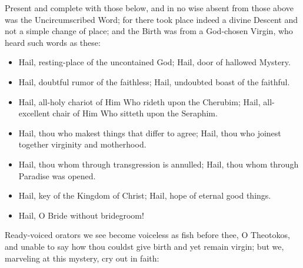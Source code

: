 \documentclass[twoside, letterpaper, 12pt]{report}
\begin{document}
\begin{reader}
  \item Present and complete with those below, and in no wise absent from those above was
  the Uncircumscribed Word; for there took place indeed a divine Descent and not a
  simple change of place; and the Birth was from a God-chosen Virgin, who heard such
  words as these:
\end{reader}

\begin{itemize}[label=\tiny{+},leftmargin=*]
\item Hail, resting-place of the uncontained God;
      Hail, door of hallowed Mystery.
\item Hail, doubtful rumor of the faithless; Hail, undoubted boast of the faithful.
\item Hail, all-holy chariot of Him Who rideth upon the Cherubim; Hail, all-excellent chair of Him
Who sitteth upon the Seraphim.
\item Hail, thou who makest things that differ to agree; Hail, thou who joinest together virginity and
motherhood.
\item Hail, thou whom through transgression is annulled; Hail, thou whom through Paradise was
opened.
\item Hail, key of the Kingdom of Christ; Hail, hope of eternal good things.
\item Hail, O Bride without bridegroom!
\end{itemize}





\begin{reader}
  \item Ready-voiced orators we see become voiceless as fish before thee, O Theotokos, and
  unable to say how thou couldst give birth and yet remain virgin; but we, marveling at
  this mystery, cry out in faith:
\end{reader}
\end{document}
